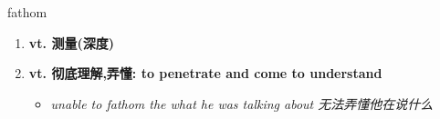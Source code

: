 
\begin{frame}
{\huge fathom}
\begin{center}
\begin{enumerate}\Large
  \item \textbf{vt. 测量(深度)}
  \item \textbf{vt. 彻底理解,弄懂: to penetrate and come to understand}
  \begin{itemize}
    \item \em{\Large{unable to fathom the what he was talking about 无法弄懂他在说什么}}
  \end{itemize}
\end{enumerate}
\end{center}
\end{frame}

